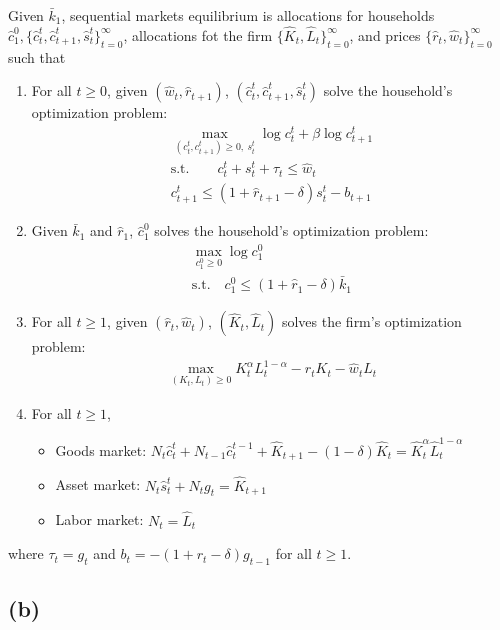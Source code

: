 \documentclass{ltjsarticle}
\begin{document}
Given $\bar{k}_1$, sequential markets equilibrium is allocations for households $\hat{c}_1^0, \{\hat{c}_t^t, \hat{c}_{t+1}^t, \hat{s}_t^t \}_{t=0}^{\infty}$, allocations fot the firm $\{\hat{K}_t, \hat{L}_t\}_{t=0}^{\infty}$, and prices $\{\hat{r}_t, \hat{w}_t\}_{t=0}^{\infty}$ such that
\begin{enumerate}
  \item For all $t \geq 0$, given $(\hat{w}_t, \hat{r}_{t+1})$, $(\hat{c}_t^t, \hat{c}_{t+1}^t, \hat{s}_t^t)$ solve the household's optimization problem:
  \begin{gather*}
    \max_{(c_t^t, c_{t+1}^t) \geq 0, \: s_t^t} \log c_t^t + \beta \log c_{t+1}^t \\
    \text{s.t.} \qquad c_t^t + s_t^t + \tau_t \leq \hat{w}_t \\
    c_{t+1}^t \leq (1 + \hat{r}_{t+1} - \delta) s_t^t - b_{t+1}
  \end{gather*}
  \item Given $\bar{k}_1$ and $\hat{r}_1$, $\hat{c}_1^0$ solves the household's optimization problem:
  \begin{gather*}
    \max_{c_1^0 \geq 0} \log c_1^0 \\
    \text{s.t.} \quad c_1^0 \leq (1 + \hat{r}_1 - \delta) \bar{k}_1
  \end{gather*}
  \item For all $t \geq 1$, given $(\hat{r}_t, \hat{w}_t)$, $(\hat{K}_t, \hat{L}_t)$ solves the firm's optimization problem:
  \begin{gather*}
    \max_{(K_t, L_t) \geq 0} K_t^\alpha L_t^{1-\alpha} - \hat{r}_t K_t - \hat{w}_t L_t
  \end{gather*}
  \item For all $t \geq 1$,
  \begin{itemize}
    \item Goods market: $N_t \hat{c}_t^t + N_{t-1} \hat{c}_t^{t-1} + \hat{K}_{t+1} - (1-\delta) \hat{K}_t  = \hat{K}_t^\alpha \hat{L}_t^{1-\alpha}$
    \item Asset market: $N_t \hat{s}_t^t + N_t g_t = \hat{K}_{t+1}$
    \item Labor market: $N_t = \hat{L}_t$
  \end{itemize}
\end{enumerate}
where $\tau_t = g_t$ and $b_t = -(1 + r_t - \delta) g_{t-1}$ for all $t \geq 1$.

\subsection*{(b)}
\end{document}
